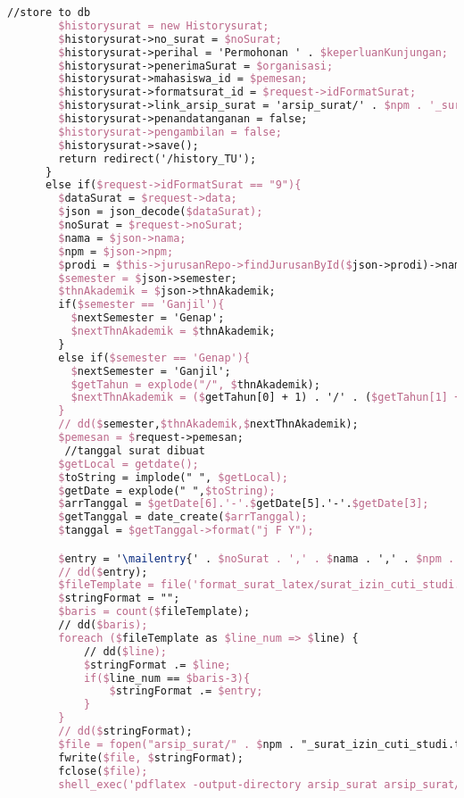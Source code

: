 \begin{lstlisting}[language=tex,basicstyle=\tiny,caption=HistorysuratController.php]
        //store to db
        $historysurat = new Historysurat;
        $historysurat->no_surat = $noSurat;
        $historysurat->perihal = 'Permohonan ' . $keperluanKunjungan;
        $historysurat->penerimaSurat = $organisasi;
        $historysurat->mahasiswa_id = $pemesan;
        $historysurat->formatsurat_id = $request->idFormatSurat;
        $historysurat->link_arsip_surat = 'arsip_surat/' . $npm . '_surat_pengantar_studi_lapangan_5orang.pdf';
        $historysurat->penandatanganan = false;
        $historysurat->pengambilan = false;
        $historysurat->save();
        return redirect('/history_TU');
      }
      else if($request->idFormatSurat == "9"){
        $dataSurat = $request->data;
        $json = json_decode($dataSurat);
        $noSurat = $request->noSurat;
        $nama = $json->nama;
        $npm = $json->npm;
        $prodi = $this->jurusanRepo->findJurusanById($json->prodi)->nama_jurusan;
        $semester = $json->semester;
        $thnAkademik = $json->thnAkademik;
        if($semester == 'Ganjil'){
          $nextSemester = 'Genap';
          $nextThnAkademik = $thnAkademik;
        }
        else if($semester == 'Genap'){
          $nextSemester = 'Ganjil';
          $getTahun = explode("/", $thnAkademik);
          $nextThnAkademik = ($getTahun[0] + 1) . '/' . ($getTahun[1] + 1);
        }
        // dd($semester,$thnAkademik,$nextThnAkademik);
        $pemesan = $request->pemesan;
         //tanggal surat dibuat
        $getLocal = getdate();
        $toString = implode(" ", $getLocal);
        $getDate = explode(" ",$toString);
        $arrTanggal = $getDate[6].'-'.$getDate[5].'-'.$getDate[3];
        $getTanggal = date_create($arrTanggal);
        $tanggal = $getTanggal->format("j F Y");

        $entry = '\mailentry{' . $noSurat . ',' . $nama . ',' . $npm . ',' . $tanggal . ',' . $semester . ',' . $thnAkademik . ',' .  $prodi . ',' . $nextSemester . ',' . $nextThnAkademik . '}';
        // dd($entry);
        $fileTemplate = file('format_surat_latex/surat_izin_cuti_studi.tex');
        $stringFormat = "";
        $baris = count($fileTemplate);
        // dd($baris);
        foreach ($fileTemplate as $line_num => $line) {
            // dd($line);
            $stringFormat .= $line;
            if($line_num == $baris-3){
                $stringFormat .= $entry;
            }
        }
        // dd($stringFormat);
        $file = fopen("arsip_surat/" . $npm . "_surat_izin_cuti_studi.tex", "w");
        fwrite($file, $stringFormat);
        fclose($file);
        shell_exec('pdflatex -output-directory arsip_surat arsip_surat/' . $npm . '_surat_izin_cuti_studi.tex');


\end{lstlisting}
